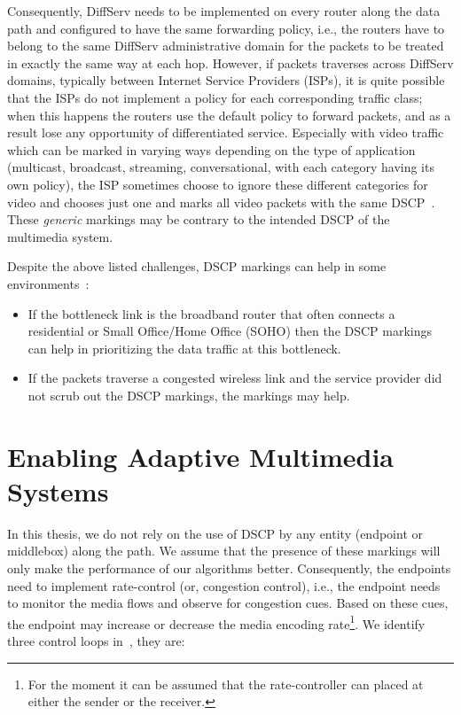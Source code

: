 Consequently, DiffServ needs to be implemented on every router along the data
path and configured to have the same forwarding policy, i.e., the routers have
to belong to the same DiffServ administrative domain for the packets to be
treated in exactly the same way at each hop. However, if packets traverses
across DiffServ domains, typically between Internet Service Providers (ISPs),
it is quite possible that the ISPs do not implement a policy for each
corresponding traffic class; when this happens the routers use the default
policy to forward packets, and as a result lose any opportunity of
differentiated service. Especially with video traffic which can be marked in
varying ways depending on the type of application (multicast, broadcast,
streaming, conversational, with each category having its own policy), the ISP
sometimes choose to ignore these different categories for video and chooses
just one and marks all video packets with the same DSCP~\cite{rfc5865}. These
\emph{generic} markings may be contrary to the intended DSCP of the multimedia
system.



Despite the above listed challenges, DSCP markings can help in some
environments~\cite{draft.rtcweb.qos}:

\begin{itemize}
	
    \item If the bottleneck link is the broadband router that often connects a
    residential or Small Office/Home Office (SOHO) then the DSCP markings can 
    help in prioritizing the data traffic at this bottleneck.

	\item If the packets traverse a congested wireless link and the service 
	provider did not scrub out the DSCP markings, the markings may help.

\end{itemize}

\section{Enabling Adaptive Multimedia Systems}

In this thesis, we do not rely on the use of DSCP by any entity (endpoint or
middlebox) along the path. We assume that the presence of these markings will
only make the performance of our algorithms better. Consequently, the
endpoints need to implement rate-control (or, congestion control), i.e., the
endpoint needs to monitor the media flows and observe for congestion cues.
Based on these cues, the endpoint may increase or decrease the media encoding
rate\footnote{For the moment it can be assumed that the rate-controller can
placed at either the sender or the receiver.}. We identify three control loops
in~\cite{Singh:control.loops.api}, they are:

